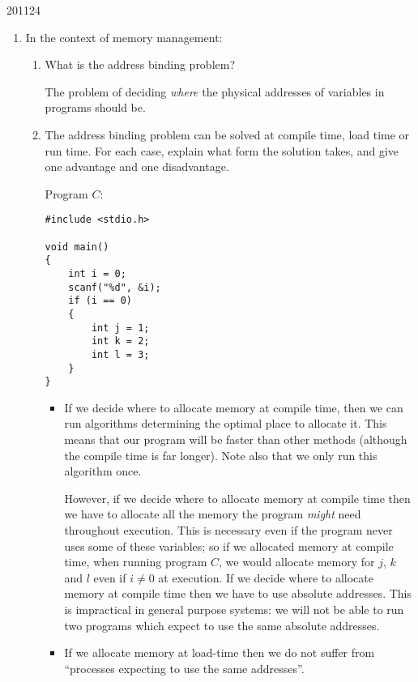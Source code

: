 \documentclass[10pt,\jkfside,a4paper]{article}
\begin{document}
\begin{examquestion}{2011}{2}{4}

\begin{enumerate}

\item In the context of memory management:

\begin{enumerate}

\item What is the address binding problem?

The problem of deciding \textit{where} the physical addresses of variables in 
programs should be.

\item  The address binding problem can be solved at compile time, load time or
run time. For each case, explain what form the solution takes, and give
one advantage and one disadvantage.

Program $C$:
\begin{lstlisting}[style=cstyle]
#include <stdio.h>

void main()
{
	int i = 0;
	scanf("%d", &i);
	if (i == 0)
	{
		int j = 1;
		int k = 2;
		int l = 3;
	}
}
\end{lstlisting}

\begin{itemize}

\item If we decide where to allocate memory at compile time, then we can run 
algorithms determining the optimal place to allocate it. This means that 
our program will be faster than other methods (although the compile time is 
far longer). Note also that we only run this algorithm once. 

However, if we decide where to allocate memory at compile time then we have to allocate 
all the memory the program \textit{might} need throughout execution. This is necessary 
even if the program never uses some of these variables; so if we allocated memory 
at compile time, when running program $C$, we would 
allocate memory for $j$, $k$ and $l$ even if $i \neq 0$ at execution.
If we decide where to allocate memory at compile time then we have to use absolute 
addresses. This is impractical in general purpose systems: we will not be able to run two 
programs which expect to use the same absolute addresses.

\item If we allocate memory at load-time then we do not suffer from ``processes expecting to 
use the same addresses''. 


\end{itemize}
\end{enumerate}
\end{enumerate}
\end{examquestion}
\end{document}
